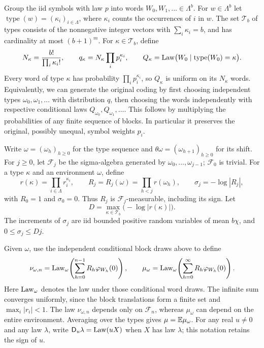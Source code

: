 Group the iid symbols with law $p$ into words
$W_0,W_1,\ldots\in\Lambda^b$.
For $w\in\Lambda^b$ let
$\operatorname{type}(w)=(\kappa_i)_{i\in\Lambda}$,
where $\kappa_i$ counts the occurrences of $i$ in $w$.
The set $\mathcal T_b$ of types consists of the nonnegative integer vectors
with $\sum_i\kappa_i=b$, and has cardinality at most $(b+1)^m$.
For $\kappa\in\mathcal T_b$, define
\[
 N_\kappa=\frac{b!}{\prod_i\kappa_i!},
 \qquad q_\kappa=N_\kappa\prod_i p_i^{\kappa_i},
 \qquad Q_\kappa
   =\operatorname{Law}\bigl(W_0\mid\operatorname{type}(W_0)=\kappa\bigr).
\]
Every word of type $\kappa$ has probability $\prod_i p_i^{\kappa_i}$,
so $Q_\kappa$ is uniform on its $N_\kappa$ words.
Equivalently, we can generate the original coding by first choosing
independent types $\omega_0,\omega_1,\ldots$ with distribution $q$,
then choosing the words independently with respective conditional laws
$Q_{\omega_0},Q_{\omega_1},\ldots$.
This follows by multiplying the probabilities of any finite sequence
of blocks.  In particular it preserves the original, possibly unequal,
symbol weights $p_i$.

Write $\omega=(\omega_h)_{h\ge0}$ for the type sequence and
$\theta\omega=(\omega_{h+1})_{h\ge0}$ for its shift.
For $j\ge0$, let $\mathcal F_j$ be the sigma-algebra generated by
$\omega_0,\ldots,\omega_{j-1}$; $\mathcal F_0$ is trivial.
For a type $\kappa$ and an environment $\omega$, define
\begin{equation}\label{eq:types-products}
 r(\kappa)=\prod_{i\in\Lambda}r_i^{\kappa_i},
 \qquad R_j=R_j(\omega)=\prod_{h<j}r(\omega_h),
 \qquad \sigma_j=-\log|R_j|,
\end{equation}
with $R_0=1$ and $\sigma_0=0$.
Thus $R_j$ is $\mathcal F_j$-measurable, including its sign.
Let
\[
 D=\max_{\kappa\in\mathcal T_b}\bigl(-\log|r(\kappa)|\bigr).
\]
The increments of $\sigma_j$ are iid bounded positive random variables
of mean $b\chi$, and $0\le\sigma_j\le Dj$.

Given $\omega$, use the independent conditional block draws above to
define
\begin{equation}\label{eq:types-laws}
 \nu_{\omega,n}
 =\operatorname{Law}_{\omega}\!\left(\sum_{h=0}^{n-1}
       R_h\varphi_{W_h}(0)\right),
 \qquad
 \mu_\omega
 =\operatorname{Law}_{\omega}\!\left(\sum_{h=0}^{\infty}
       R_h\varphi_{W_h}(0)\right).
\end{equation}
Here $\operatorname{Law}_\omega$ denotes the law under those conditional word draws.
The infinite sum converges uniformly, since the block translations form
a finite set and $\max_i|r_i|<1$.
The law $\nu_{\omega,n}$ depends only on $\mathcal F_n$, whereas
$\mu_\omega$ can depend on the entire environment.
Averaging over the types gives $\mu=\mathbb E\mu_\omega$.
For any real $u\ne0$ and any law $\lambda$, write
$\mathsf D_u\lambda=\operatorname{Law}(uX)$ when $X$ has law $\lambda$;
this notation retains the sign of $u$.

